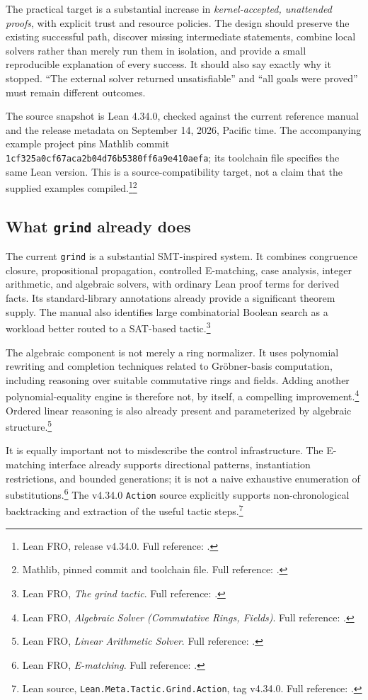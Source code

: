 \documentclass[11pt,letterpaper]{article}
\newcommand{\Lean}{\textsf{Lean}}
\newcommand{\grind}{\texttt{grind}}
\newcommand{\src}[2]{\footnote{#2. Full reference: \cite{#1}.}}
\theoremstyle{definition}
\theoremstyle{remark}
\begin{document}
The practical target is a substantial increase in \emph{kernel-accepted, unattended proofs}, with explicit trust and resource policies. The design should preserve the existing successful path, discover missing intermediate statements, combine local solvers rather than merely run them in isolation, and provide a small reproducible explanation of every success. It should also say exactly why it stopped. ``The external solver returned unsatisfiable'' and ``all goals were proved'' must remain different outcomes.

The source snapshot is \Lean{} 4.34.0, checked against the current reference manual and the release metadata on September 14, 2026, Pacific time. The accompanying example project pins Mathlib commit \texttt{1cf325a0cf67aca2b04d76b5380ff6a9e410aefa}; its toolchain file specifies the same \Lean{} version. This is a source-compatibility target, not a claim that the supplied examples compiled.\src{leanrelease}{Lean FRO, release v4.34.0}\src{mathlibpin}{Mathlib, pinned commit and toolchain file}

\subsection{What \grind{} already does}
The current \grind{} is a substantial SMT-inspired system. It combines congruence closure, propositional propagation, controlled E-matching, case analysis, integer arithmetic, and algebraic solvers, with ordinary \Lean{} proof terms for derived facts. Its standard-library annotations already provide a significant theorem supply. The manual also identifies large combinatorial Boolean search as a workload better routed to a SAT-based tactic.\src{grindmanual}{Lean FRO, \emph{The grind tactic}}

The algebraic component is not merely a ring normalizer. It uses polynomial rewriting and completion techniques related to Gr\"obner-basis computation, including reasoning over suitable commutative rings and fields. Adding another polynomial-equality engine is therefore not, by itself, a compelling improvement.\src{grindring}{Lean FRO, \emph{Algebraic Solver (Commutative Rings, Fields)}} Ordered linear reasoning is also already present and parameterized by algebraic structure.\src{grindlinear}{Lean FRO, \emph{Linear Arithmetic Solver}}

It is equally important not to misdescribe the control infrastructure. The E-matching interface already supports directional patterns, instantiation restrictions, and bounded generations; it is not a naive exhaustive enumeration of substitutions.\src{grindematch}{Lean FRO, \emph{E-matching}} The v4.34.0 \texttt{Action} source explicitly supports non-chronological backtracking and extraction of the useful tactic steps.\src{grindaction}{Lean source, \texttt{Lean.Meta.Tactic.Grind.Action}, tag v4.34.0}
\end{document}
